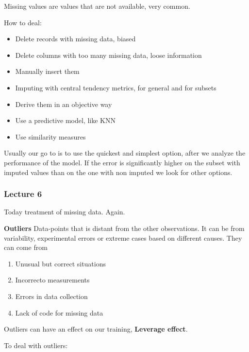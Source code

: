 \vspace{10pt}

Missing values are values that are not available, very common. 

How to deal:
\begin{itemize}
    \item Delete records with missing data, biased
    \item Delete columns with too many missing data, loose information
    \item Manually insert them
    \item Imputing with central tendency metrics, for general and for subsets
    \item Derive them in an objective way
    \item Use a predictive model, like KNN
    \item Use similarity measures
\end{itemize}

\vspace{10pt}

Usually our go to is to use the quickest and simplest option, after we analyze the performance of the model.
If the error is significantly higher on the subset with imputed values than on the one with non imputed we look for other options.


\subsubsection{Lecture 6}


Today treatment of missing data. Again.

\vspace{10pt}

\textbf{Outliers} \ra Data-points that is distant from the other observations.
It can be from variability, experimental errors or extreme cases based on different causes. 
They can come from
\begin{enumerate}
    \item Unusual but correct situations
    \item Incorrecto measurements
    \item Errors in data collection
    \item Lack of code for missing data
\end{enumerate}

Outliers can have an effect on our training, \textbf{Leverage effect}.



To deal with outliers:


